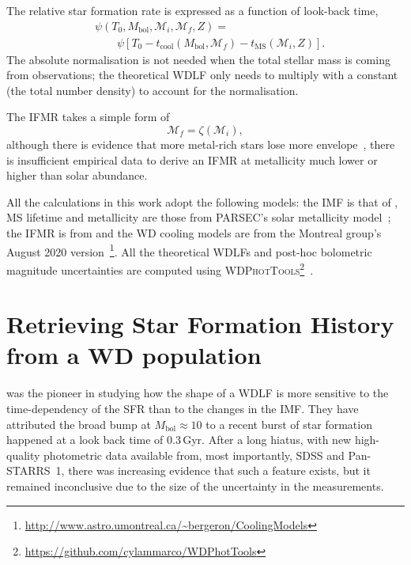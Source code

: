 \documentclass[fleqn,usenatbib]{mnras}
\begin{document}
The relative star formation rate is expressed as a function of look-back time,
\begin{align}
    &\psi(T_0, M_\mathrm{bol}, \mathcal{M}_i, \mathcal{M}_f, Z) =\\
    &\qquad\psi\left[T_0 - t_{\mathrm{cool}}\left(M_\mathrm{bol}, \mathcal{M}_f\right) - t_{\mathrm{MS}}\left(\mathcal{M}_i, Z\right)\right].
\end{align}
The absolute normalisation is not needed when the total stellar mass is coming
from observations; the theoretical WDLF only needs to multiply with a
constant (the total number density) to account for the normalisation.

The IFMR takes a simple form of
\begin{equation}
    \mathcal{M}_f = \zeta(\mathcal{M}_i),
\end{equation}
although there is evidence that more metal-rich stars lose more
envelope~\citep{2007ApJ...671..761K}, there is insufficient empirical data
to derive an IFMR at metallicity much lower or higher than solar abundance.

All the calculations in this work adopt the following models: the IMF is that of
\citet{2003PASP..115..763C}, MS lifetime and metallicity are those from
PARSEC's solar metallicity model~\citep[Z=0.017, Y=0.279;][]{2012MNRAS.427..127B}; the IFMR is
from \citet{2008MNRAS.387.1693C} and the WD cooling models are from the
Montreal group's August 2020 version~\citep{2020ApJ...901...93B}\footnote{\url{http://www.astro.umontreal.ca/~bergeron/CoolingModels}}.
All the theoretical WDLFs and post-hoc bolometric magnitude uncertainties are
computed using \textsc{WDPhotTools}\footnote{\url{https://github.com/cylammarco/WDPhotTools}}~\citep{marco_c_lam_2022_6595029, 
2022RASTI...1...81L}.

\section{Retrieving Star Formation History from a WD population}
\citet{1990ApJ...352..605N} was the pioneer in studying how the shape of
a WDLF is more sensitive to the time-dependency of the SFR than to the changes
in the IMF. They have attributed the broad bump at $M_{\mathrm{bol}} \approx 10$
to a recent burst of star formation happened at a look back time of 0.3\,Gyr.
After a long hiatus, with new high-quality photometric data available from,
most importantly, SDSS and Pan-STARRS~1, there was increasing evidence that
such a feature exists, but it remained inconclusive due to the size of the
uncertainty in the measurements.
\end{document}
